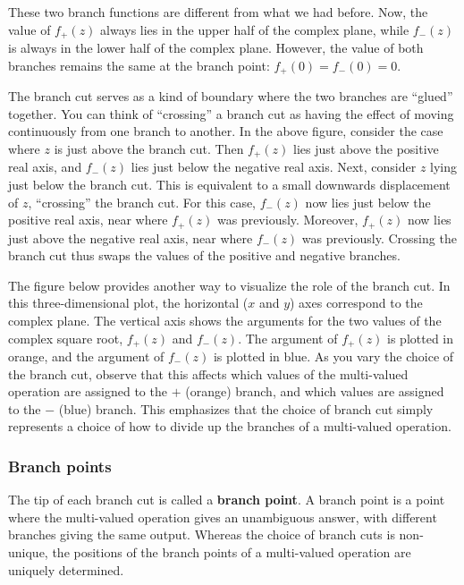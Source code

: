 \documentclass[10pt,a4paper]{article}
\begin{document}
These two branch functions are different from what we had before. Now,
the value of $f_+(z)$ always lies in the upper half of the complex
plane, while $f_-(z)$ is always in the lower half of the complex
plane. However, the value of both branches remains the same at the
branch point: $f_+(0) = f_-(0) = 0$.

The branch cut serves as a kind of boundary where the two branches are
``glued'' together. You can think of ``crossing'' a branch cut as
having the effect of moving continuously from one branch to
another. In the above figure, consider the case where $z$ is just
above the branch cut. Then $f_+(z)$ lies just above the positive real
axis, and $f_-(z)$ lies just below the negative real axis. Next,
consider $z$ lying just below the branch cut. This is equivalent to a
small downwards displacement of $z$, ``crossing'' the branch cut. For
this case, $f_-(z)$ now lies just below the positive real axis, near
where $f_+(z)$ was previously. Moreover, $f_+(z)$ now lies just above
the negative real axis, near where $f_-(z)$ was previously. Crossing
the branch cut thus swaps the values of the positive and negative
branches.

The figure below provides another way to visualize the role of the
branch cut. In this three-dimensional plot, the horizontal ($x$ and
$y$) axes correspond to the complex plane. The vertical axis shows the
arguments for the two values of the complex square root, $f_+(z)$ and
$f_-(z)$. The argument of $f_+(z)$ is plotted in orange, and the
argument of $f_-(z)$ is plotted in blue. As you vary the choice of the
branch cut, observe that this affects which values of the multi-valued
operation are assigned to the $+$ (orange) branch, and which values
are assigned to the $-$ (blue) branch. This emphasizes that the choice
of branch cut simply represents a choice of how to divide up the
branches of a multi-valued operation.

\subsubsection{Branch points}
\label{branch-points}

The tip of each branch cut is called a \textbf{branch point}. A branch
point is a point where the multi-valued operation gives an unambiguous
answer, with different branches giving the same output. Whereas the
choice of branch cuts is non-unique, the positions of the branch points
of a multi-valued operation are uniquely determined.
\end{document}
